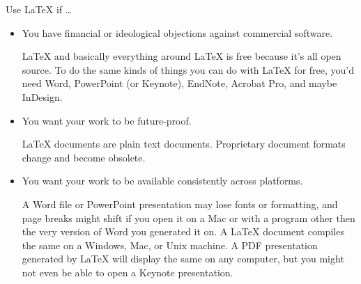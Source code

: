 \begin{frame}{Use \LaTeX{} if \dots}

\begin{itemize}
\item You have financial or ideological objections against commercial
  software.

\begin{articleonly}
\LaTeX{} and basically everything around \LaTeX{} is free because it's
all open source. To do the same kinds of things you can do with
\LaTeX{} for free, you'd need Word, PowerPoint (or Keynote), EndNote,
Acrobat Pro, and maybe InDesign.
\end{articleonly}

\item You want your work to be future-proof.

\begin{articleonly}
\LaTeX{} documents are plain text documents. Proprietary document
formats change and become obsolete.
\end{articleonly}

\item You want your work to be available consistently across platforms.

\begin{articleonly}
A Word file or PowerPoint presentation may lose fonts or formatting,
and page breaks might shift if you open it on a Mac or with a program
other then the very version of Word you generated it on.  A \LaTeX{}
document compiles the same on a Windows, Mac, or Unix machine.  A PDF
presentation generated by \LaTeX{} will display the same on any
computer, but you might not even be able to open a Keynote
presentation.
\end{articleonly}
\end{itemize}

\end{frame}


